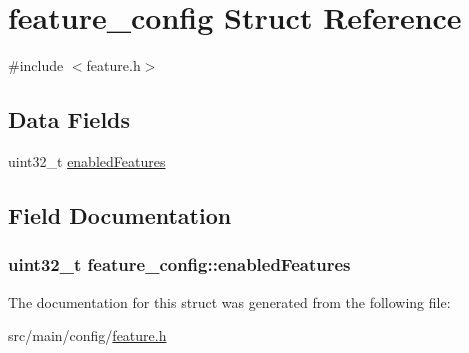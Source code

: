 \hypertarget{structfeature__config}{\section{feature\+\_\+config Struct Reference}
\label{structfeature__config}
}


{\ttfamily \#include $<$feature.\+h$>$}

\subsection*{Data Fields}
\begin{DoxyCompactItemize}
\item 
uint32\+\_\+t \hyperlink{structfeature__config_ae1922b16ca6ab1f2eaf0a9590193d22e}{enabled\+Features}
\end{DoxyCompactItemize}


\subsection{Field Documentation}
\hypertarget{structfeature__config_ae1922b16ca6ab1f2eaf0a9590193d22e}{
\subsubsection[{enabled\+Features}]{\setlength{\rightskip}{0pt plus 5cm}uint32\+\_\+t feature\+\_\+config\+::enabled\+Features}}\label{structfeature__config_ae1922b16ca6ab1f2eaf0a9590193d22e}


The documentation for this struct was generated from the following file\+:\begin{DoxyCompactItemize}
\item 
src/main/config/\hyperlink{feature_8h}{feature.\+h}\end{DoxyCompactItemize}
